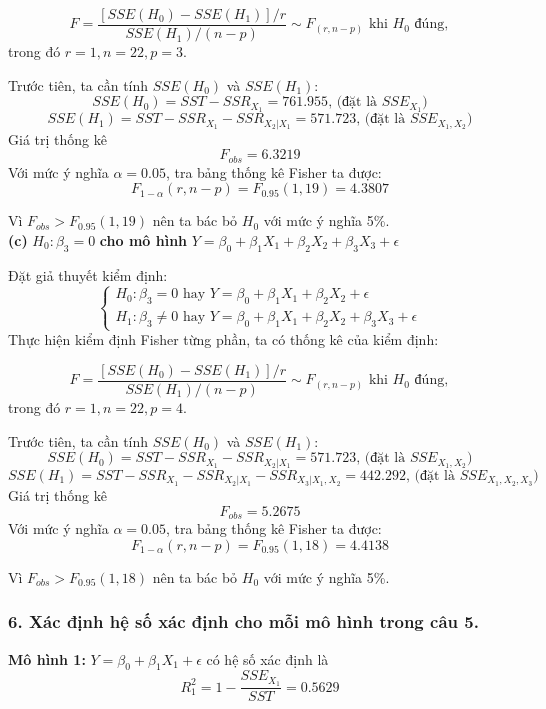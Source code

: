 \documentclass[a4paper]{article}
\theoremstyle{nonumberplain}
\begin{document}
$$F = \displaystyle \frac{\left [ SSE (H_0) - SSE(H_1) \right ] / r}{SSE(H_1)/(n-p)} \sim F_{(r,n-p)} \text{ khi } H_0 \text{ đúng},$$
trong đó $r = 1, n = 22, p = 3$.

Trước tiên, ta cần tính $SSE (H_0)$ và $SSE(H_1)$:
$$SSE(H_0) = SST - SSR_{X_1} = 761.955 \text{, (đặt là } SSE_{X_1})$$
$$SSE(H_1) = SST - SSR_{X_1} - SSR_{X_2|X_1} = 571.723 \text{, (đặt là }  SSE_{X_1,X_2})$$
Giá trị thống kê $$F_{obs} = 6.3219$$
Với mức ý nghĩa $\alpha = 0.05$, tra bảng thống kê Fisher ta được:
$$F_{1-\alpha}(r,n-p) = F_{0.95}(1,19) = 4.3807$$

Vì $F_{obs}>F_{0.95}(1,19)$ nên ta bác bỏ $H_0$ với mức ý nghĩa 5\%.\\


\textbf{(c)} $H_0 : \beta_3 = 0$ \textbf{cho mô hình } $Y = \beta_0 + \beta_1 X_1 + \beta_2 X_2 + \beta_3 X_3 + \epsilon $

Đặt giả thuyết kiểm định:
\[\begin{cases}
	H_0 : \beta_3 = 0 \text{ hay } Y = \beta_0 + \beta_1 X_1 + \beta_2 X_2 + \epsilon \\
	H_1 : \beta_3 \ne 0 \text{ hay } Y = \beta_0 + \beta_1 X_1 + \beta_2 X_2 + \beta_3 X_3 + \epsilon 
\end{cases}\]
Thực hiện kiểm định Fisher từng phần, ta có thống kê của kiểm định: 

$$F = \displaystyle \frac{\left [ SSE (H_0) - SSE(H_1) \right ] / r}{SSE(H_1)/(n-p)}  \sim F_{(r,n-p)} \text{ khi } H_0 \text{ đúng},$$
trong đó $r = 1, n = 22, p = 4$.

Trước tiên, ta cần tính $SSE (H_0)$ và $SSE(H_1)$:
$$SSE(H_0) = SST - SSR_{X_1} - SSR_{X_2|X_1} = 571.723 \text{, (đặt là }  SSE_{X_1,X_2}) $$
$$SSE(H_1) = SST - SSR_{X_1} - SSR_{X_2|X_1} - SSR_{X_3|X_1,X_2} = 442.292 \text{, (đặt là }  SSE_{X_1,X_2,X_3})$$
Giá trị thống kê $$F_{obs} = 5.2675$$
Với mức ý nghĩa $\alpha = 0.05$, tra bảng thống kê Fisher ta được:
$$F_{1-\alpha}(r,n-p) = F_{0.95}(1,18) = 4.4138$$

Vì $F_{obs}>F_{0.95}(1,18)$ nên ta bác bỏ $H_0$ với mức ý nghĩa 5\%.

\subsubsection*{6. Xác định hệ số xác định cho mỗi mô hình trong câu 5.}

\textbf{Mô hình 1:} $Y = \beta_0 + \beta_1 X_1 + \epsilon $ có hệ số xác định là
$$R^2_1 = 1 - \displaystyle \frac{SSE_{X_1}}{SST} = 0.5629$$
\end{document}
